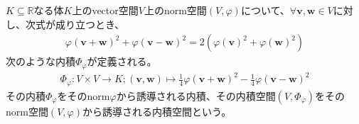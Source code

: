 \documentclass[dvipdfmx]{jsarticle}
\begin{document}
\begin{dfn}
$K \subseteq \mathbb{R}$なる体$K$上のvector空間$V$上のnorm空間$(V,\varphi)$について、$\forall\mathbf{v},\mathbf{w} \in V$に対し、次式が成り立つとき、
\begin{align*}
{\varphi\left( \mathbf{v} + \mathbf{w} \right)}^{2} + {\varphi\left( \mathbf{v} - \mathbf{w} \right)}^{2} = 2\left( {\varphi\left( \mathbf{v} \right)}^{2} + {\varphi\left( \mathbf{w} \right)}^{2} \right)
\end{align*}
次のような内積$\varPhi_{\varphi}$が定義される。
\begin{align*}
\varPhi_{\varphi}:V \times V \rightarrow K;\left( \mathbf{v},\mathbf{w} \right) \mapsto \frac{1}{4}{\varphi\left( \mathbf{v} + \mathbf{w} \right)}^{2} - \frac{1}{4}{\varphi\left( \mathbf{v} - \mathbf{w} \right)}^{2}
\end{align*}
その内積$\varPhi_{\varphi}$をそのnorm$\varphi$から誘導される内積、その内積空間$\left( V,\varPhi_{\varphi} \right)$をそのnorm空間$(V,\varphi)$から誘導される内積空間という。
\end{dfn}
\end{document}
